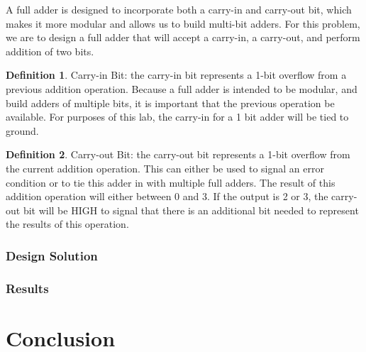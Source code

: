 \documentclass[11pt]{article}
\begin{document}
A full adder is designed to incorporate both a carry-in and carry-out bit, which makes it more modular and allows us to build multi-bit adders. For this problem, we are to design a full adder that will accept a carry-in, a carry-out, and perform addition of two bits.

\theoremstyle{definition}
\newtheorem{definition}{Definition}
\begin{definition}
Carry-in Bit: the carry-in bit represents a 1-bit overflow from a previous addition operation. Because a full adder is intended to be modular, and build adders of multiple bits, it is important that the previous operation be available. For purposes of this lab, the carry-in for a 1 bit adder will be tied to ground.
\end{definition}

\begin{definition}
	Carry-out Bit: the carry-out bit represents a 1-bit overflow from the current addition operation. This can either be used to signal an error condition or to tie this adder in with multiple full adders. The result of this addition operation will either between 0 and 3. If the output is 2 or 3, the carry-out bit will be HIGH to signal that there is an additional bit needed to represent the results of this operation.
\end{definition}

\subsubsection{Design Solution}

\subsubsection{Results}

\section{Conclusion}
\end{document}
